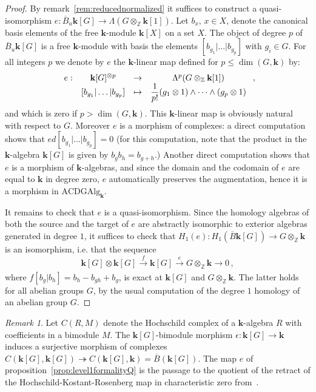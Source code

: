 \documentclass{amsart}
\theoremstyle{definition}
\theoremstyle{remark}
\newtheorem{remark}[formula]{Remark}
\newcommand{\Z}{\mathbb Z}
\renewcommand{\le}{\leqslant}
\def\k{\mathbf{k}}
\begin{document}
\begin{proof}
	By remark~\ref{rem:reducednormalized} it suffices to construct a quasi-isomorphism $e:\overline{B}_u\k[G]\to \Lambda(G\otimes_\Z\k [1])$.
	Let $b_x$, $x\in X$, denote the canonical basis elements of the free $\k$-module $\k[X]$ on a set $X$.
	The object of degree $p$ of $\overline{B}_u\k[G]$ is a free $\k$-module with basis the elements $[b_{g_1}|\dots|b_{g_p}]$ with $g_i\in G$. For all integers $p$ we denote by $e$ the $\k$-linear map defined for $p\le \dim(G,\k)$ by:
	\[
	\begin{array}[t]{cccc}
		e:  & \k[G]^{\otimes p} & \to & \Lambda^p(G\otimes_\Z\k [1]) \\
		& [b_{g_1}|\dots|b_{g_p}] & \mapsto & \dfrac{1}{p!}(g_1\otimes 1)\wedge\cdots\wedge (g_p\otimes 1)
	\end{array}\;,
	\]
	and which is zero if $p>\dim(G,\k)$.
	This $\k$-linear map is obviously natural with respect to $G$. Moreover $e$ is a morphism of complexes: a direct computation shows that $ed[b_{g_1}|\dots|b_{g_p}]=0$ (for this computation, note that the product in the $\k$-algebra $\k[G]$ is given by $b_gb_h=b_{g+h}$.) Another direct computation shows that $e$ is a morphism of $\k$-algebras, and since the domain and the codomain of $e$ are equal to $\k$ in degree zero, $e$ automatically preserves the augmentation, hence it is a morphism in $\mathrm{ACDGAlg}_\k$.
	
	It remains to check that $e$ is a quasi-isomorphism. Since the homology algebras of both the source and the target of $e$ are abstractly isomorphic to exterior algebras generated in degree $1$, it suffices to check that $H_1(e):H_1(\overline{B}\k[G])\to G\otimes_\Z\k$ is an isomorphism, i.e. that the sequence
	\[\k[G]\otimes \k[G]\xrightarrow[]{f} \k[G]\xrightarrow[]{e} G\otimes_\Z\k\to 0\,,\]
	where $f[b_g|b_h]=b_h-b_{gh}+b_g$, is exact at $\k[G]$ and $G\otimes_\Z\k$. The latter holds for all abelian groups $G$, by the usual computation of the degree $1$ homology of an abelian group $G$.
\end{proof}

\begin{remark}
	Let $C(R,M)$ denote the Hochschild complex of a $\k$-algebra $R$ with coefficients in a bimodule $M$. The $\k[G]$-bimodule morphism $\epsilon:\k[G]\to \k$ induces a surjective morphism of complexes $C(\k[G],\k[G])\twoheadrightarrow C(\k[G],\k)=\overline{B}(\k[G])$. The map $e$ of proposition~\ref{prop:level1formalityQ} is the passage to the quotient of the retract of the Hochschild-Kostant-Rosenberg map in characteristic zero from~\cite[Corollary~9.4.4]{we-97}. 
\end{remark}
\end{document}

